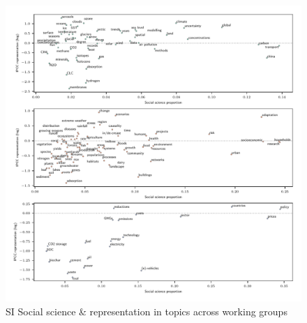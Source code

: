 \documentclass{article}
\begin{document}
\begin{linenumbers}
\begin{figure}
	\begin{center}
		\includegraphics[width=1\linewidth]{plots_pub/wgs_socsci.pdf}
		\caption{SI Social science \& representation in topics across working groups}
		\label{socsci-wgs}
	\end{center}
\end{figure}


\end{linenumbers}
\end{document}
